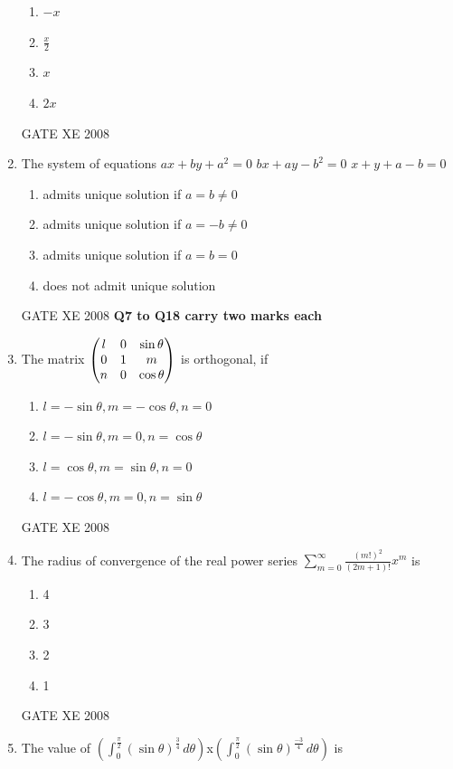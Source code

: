 \documentclass[12pt]{article}
\begin{document}
\begin{enumerate}
\begin{enumerate}
\item  $-x$
\item  $\frac{x}{2}$
\item  $x$
\item $2x$
\end{enumerate}

GATE XE 2008
\item The system of equations \newline $ax+by+a^2=0$ \newline $bx+ay-b^2=0$ \newline $x+y+a-b=0$

\begin{enumerate}
\item  admits unique solution if $a=b\not =0$
\item admits unique solution if $a=-b\not=0$
\item admits unique solution if $a=b=0$
\item does not admit unique solution
\end{enumerate}

GATE XE 2008\newline
\textbf{Q7 to Q18 carry two marks each}
\item The matrix $\begin{pmatrix}l&0&\sin\theta\\0&1&m\\n&0&\cos\theta\end{pmatrix}$ is orthogonal, if

\begin{enumerate}
\item $l=-\sin\theta, m=-\cos\theta, n=0$
\item $l=-\sin\theta, m=0, n=\cos\theta$
\item $l=\cos\theta, m=\sin\theta, n=0$
\item $l=-\cos\theta, m=0, n=\sin\theta$
\end{enumerate}

GATE XE 2008
\item The radius of convergence of the real power series $\sum_{m=0}^{\infty} \frac{(m!)^2}{(2m+1)!} x^m$ is

\begin{enumerate}
\item 4
\item  3
\item 2
\item 1
\end{enumerate}

GATE XE 2008
\item The value of \newline$(\int_{0}^{\frac{\pi}{2}} (\sin\theta)^\frac{3}{4} \, d\theta)$x$(\int_{0}^{\frac{\pi}{2}} (\sin\theta)^\frac{-3}{4} \, d\theta)$ is


\end{enumerate}
\end{document}
